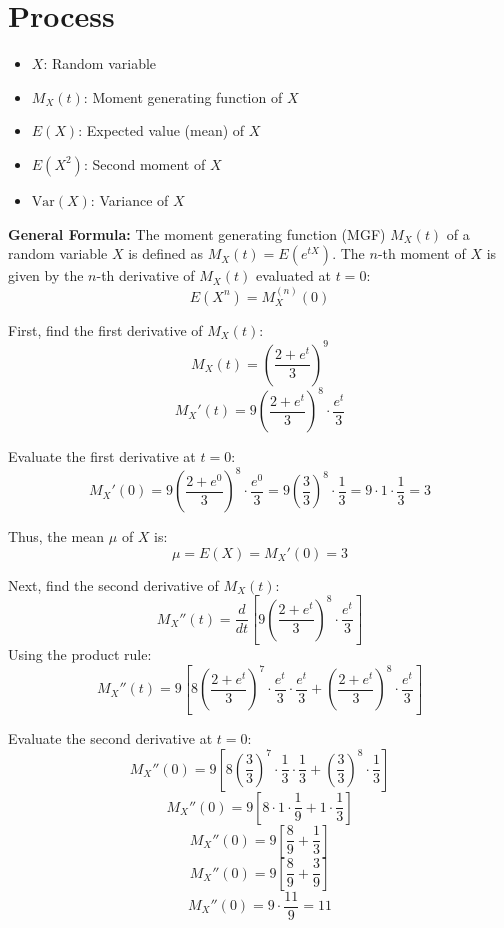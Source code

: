 \documentclass[12pt]{article}
\begin{document}
\section*{Process}
\begin{itemize}
  \item \( X \): Random variable
  \item \( M_X(t) \): Moment generating function of \( X \)
  \item \( E(X) \): Expected value (mean) of \( X \)
  \item \( E(X^2) \): Second moment of \( X \)
  \item \( \text{Var}(X) \): Variance of \( X \)
\end{itemize}
\textbf{General Formula:}
The moment generating function (MGF) \( M_X(t) \) of a random variable \( X \) is defined as \( M_X(t) = E(e^{tX}) \). The \( n \)-th moment of \( X \) is given by the \( n \)-th derivative of \( M_X(t) \) evaluated at \( t = 0 \):
\[ E(X^n) = M_X^{(n)}(0) \]

First, find the first derivative of \( M_X(t) \):
\[ M_X(t) = \left(\frac{2+e^t}{3}\right)^9 \]
\[ M_X'(t) = 9 \left(\frac{2+e^t}{3}\right)^8 \cdot \frac{e^t}{3} \]

Evaluate the first derivative at \( t = 0 \):
\[ M_X'(0) = 9 \left(\frac{2+e^0}{3}\right)^8 \cdot \frac{e^0}{3} = 9 \left(\frac{3}{3}\right)^8 \cdot \frac{1}{3} = 9 \cdot 1 \cdot \frac{1}{3} = 3 \]

Thus, the mean \( \mu \) of \( X \) is:
\[ \mu = E(X) = M_X'(0) = 3 \]

Next, find the second derivative of \( M_X(t) \):
\[ M_X''(t) = \frac{d}{dt} \left[ 9 \left(\frac{2+e^t}{3}\right)^8 \cdot \frac{e^t}{3} \right] \]
Using the product rule:
\[ M_X''(t) = 9 \left[ 8 \left(\frac{2+e^t}{3}\right)^7 \cdot \frac{e^t}{3} \cdot \frac{e^t}{3} + \left(\frac{2+e^t}{3}\right)^8 \cdot \frac{e^t}{3} \right] \]

Evaluate the second derivative at \( t = 0 \):
\[ M_X''(0) = 9 \left[ 8 \left(\frac{3}{3}\right)^7 \cdot \frac{1}{3} \cdot \frac{1}{3} + \left(\frac{3}{3}\right)^8 \cdot \frac{1}{3} \right] \]
\[ M_X''(0) = 9 \left[ 8 \cdot 1 \cdot \frac{1}{9} + 1 \cdot \frac{1}{3} \right] \]
\[ M_X''(0) = 9 \left[ \frac{8}{9} + \frac{1}{3} \right] \]
\[ M_X''(0) = 9 \left[ \frac{8}{9} + \frac{3}{9} \right] \]
\[ M_X''(0) = 9 \cdot \frac{11}{9} = 11 \]
\end{document}
